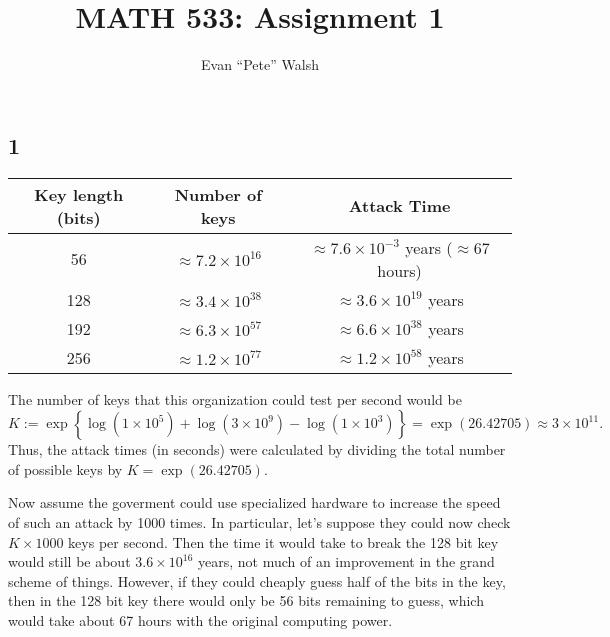 \documentclass[12pt]{article}
\title{MATH 533: Assignment 1}
\author{Evan ``Pete'' Walsh}
\begin{document}
\maketitle


\subsection*{1}
\begin{table}[h!]
  \centering
  \begin{tabular}{c|c|c}
    Key length (bits) & Number of keys & Attack Time \\
    \hline 
    56 & $\approx 7.2\times 10^{16}$ & $\approx 7.6\times 10^{-3}$ years ($\approx 67$ hours) \\
    128 & $\approx 3.4\times 10^{38}$ & $\approx 3.6 \times 10^{19}$ years \\
    192 & $\approx 6.3\times 10^{57}$ & $\approx 6.6 \times 10^{38}$ years \\
    256 & $\approx 1.2\times 10^{77}$ & $\approx 1.2 \times 10^{58}$ years \\
  \end{tabular}
\end{table}

The number of keys that this organization could test per second would be 
\[
  K := \exp\left\{\log(1\times 10^5) + \log(3\times 10^{9}) - \log(1\times 10^{3})\right\} = \exp(26.42705) \approx 3\times 10^{11}.
\]
Thus, the attack times (in seconds) were calculated by dividing the total number of possible keys by
$K = \exp(26.42705)$.

Now assume the goverment could use specialized hardware to increase the speed of such an attack by 1000 times. In particular,
let's suppose they could now check $K \times 1000$ keys per second. Then the time it would take to break the 128 bit key would 
still be about $3.6\times 10^{16}$ years, not much of an improvement in the grand scheme of things.
However, if they could cheaply guess half of the bits in the key, then in the 128 bit key there would only be 56 bits remaining to guess,
which would take about 67 hours with the original computing power.
\end{document}

